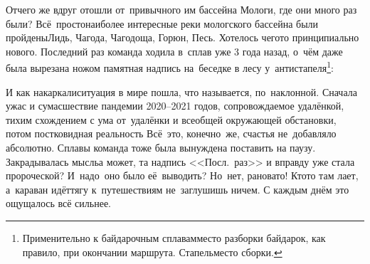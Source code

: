 {{\renewcommand*{\thefootnote}{\fnsymbol{footnote}}
\setcounter{footnote}{0}
Отчего же вдруг отошли от~привычного им бассейна Мологи, где они много раз были? Всё~просто\mdash наиболее интересные реки мологского бассейна были пройдены\mdash Лидь, Чагода, Чагодоща, Горюн, Песь. Хотелось чего\sdash то принципиально нового. Последний раз команда ходила в~сплав уже 3 года назад, о~чём даже была вырезана ножом памятная надпись на~беседке в лесу у~антистапеля\footnote{Применительно к байдарочным сплавам\mdash место разборки байдарок, как правило, при окончании маршрута. Стапель\mdash место сборки.}: %

\vspace{6mm}
{\centering\Huge{}}

\newpage
И как накаркали\mdash ситуация в мире пошла, что называется, по~наклонной. Сначала ужас и сумасшествие пандемии 2020\nobreakdash--2021 годов, сопровождаемое удалёнкой, тихим схождением с ума от~удалёнки и всеобщей окружающей обстановки, потом постковидная реальность\myldots{} Всё~это, конечно~же, счастья не~добавляло абсолютно. Сплавы команда тоже была вынуждена поставить на паузу. Закрадывалась мысль\mdash а может, та надпись <<Посл.~раз>> и вправду уже стала пророческой? И~надо~оно было её~выводить? Но~нет, рановато! Кто\sdash то там лает, а~караван идёт\mdash тягу к~путешествиям не~заглушишь ничем. С каждым днём это ощущалось всё сильнее.


}}
